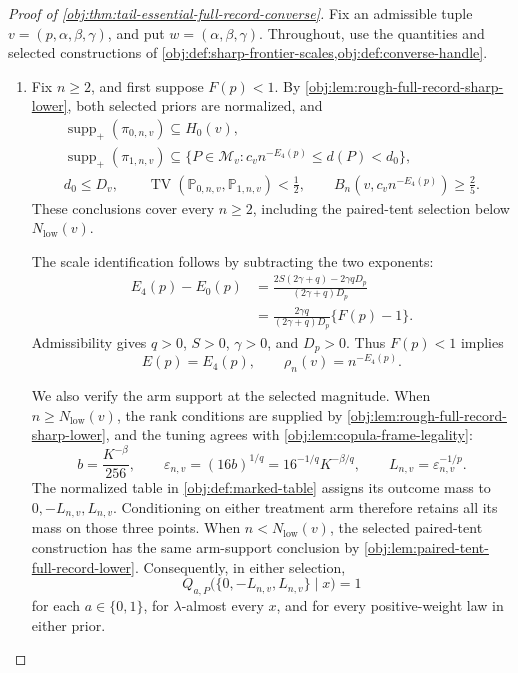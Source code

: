 \begin{proof}[Proof of \cref{obj:thm:tail-essential-full-record-converse}]
Fix an admissible tuple \(v=(p,\alpha,\beta,\gamma)\), and put
\(w=(\alpha,\beta,\gamma)\). Throughout, use the quantities and selected
constructions of
\cref{obj:def:sharp-frontier-scales,obj:def:converse-handle}.

\begin{enumerate}
\item
Fix \(n\ge2\), and first suppose \(F(p)<1\).
By \cref{obj:lem:rough-full-record-sharp-lower}, both selected priors are
normalized, and
\[
\begin{gathered}
\operatorname{supp}_+(\pi_{0,n,v})\subseteq H_0(v),\\
\operatorname{supp}_+(\pi_{1,n,v})
\subseteq
\{P\in\mathcal M_v:c_vn^{-E_4(p)}\le d(P)<d_0\},\\
d_0\le D_v,\qquad
\operatorname{TV}(\mathbb P_{0,n,v},\mathbb P_{1,n,v})<\frac12,\qquad
B_n(v,c_vn^{-E_4(p)})\ge\frac25.
\end{gathered}
\]
These conclusions cover every \(n\ge2\), including the paired-tent
selection below \(N_{\mathrm{low}}(v)\).

The scale identification follows by subtracting the two exponents:
\[
\begin{aligned}
E_4(p)-E_0(p)
&=
\frac{2S(2\gamma+q)-2\gamma qD_p}
     {(2\gamma+q)D_p}\\
&=
\frac{2\gamma q}{(2\gamma+q)D_p}\{F(p)-1\}.
\end{aligned}
\]
Admissibility gives \(q>0\), \(S>0\), \(\gamma>0\), and \(D_p>0\).
Thus \(F(p)<1\) implies
\[
E(p)=E_4(p),\qquad \rho_n(v)=n^{-E_4(p)}.
\]

We also verify the arm support at the selected magnitude. When
\(n\ge N_{\mathrm{low}}(v)\), the rank conditions are supplied by
\cref{obj:lem:rough-full-record-sharp-lower}, and the tuning agrees with
\cref{obj:lem:copula-frame-legality}:
\[
b=\frac{K^{-\beta}}{256},\qquad
\varepsilon_{n,v}=(16b)^{1/q}
=16^{-1/q}K^{-\beta/q},\qquad
L_{n,v}=\varepsilon_{n,v}^{-1/p}.
\]
The normalized table in \cref{obj:def:marked-table} assigns its outcome
mass to \(0,-L_{n,v},L_{n,v}\). Conditioning on either treatment arm
therefore retains all its mass on those three points. When
\(n<N_{\mathrm{low}}(v)\), the selected paired-tent construction has the
same arm-support conclusion by
\cref{obj:lem:paired-tent-full-record-lower}. Consequently, in either
selection,
\[
Q_{a,P}\bigl(\{0,-L_{n,v},L_{n,v}\}\mid x\bigr)=1
\]
for each \(a\in\{0,1\}\), for \(\lambda\)-almost every \(x\), and for every
positive-weight law in either prior.


\end{enumerate}
\end{proof}
